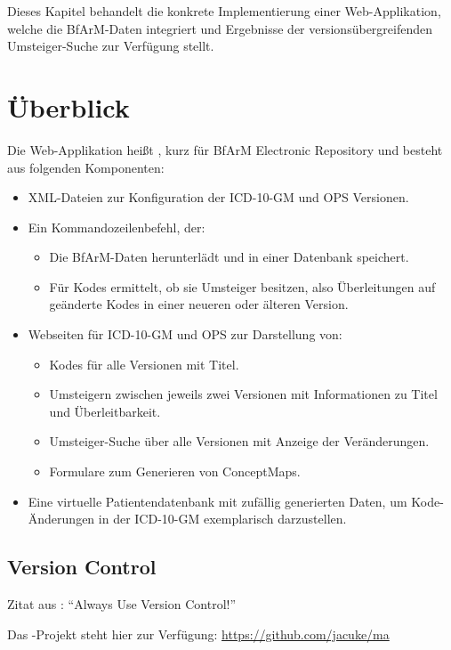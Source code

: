 Dieses Kapitel behandelt die konkrete Implementierung einer Web-Applikation, welche die BfArM-Daten integriert und Ergebnisse der versionsübergreifenden Umsteiger-Suche zur Verfügung stellt.

\section{Überblick}

Die Web-Applikation heißt \bfarmer, kurz für BfArM Electronic Repository und besteht aus folgenden Komponenten:

\begin{itemize}
\item XML-Dateien zur Konfiguration der ICD-10-GM und OPS Versionen.
\item Ein Kommandozeilenbefehl, der:
\begin{itemize}
\item Die BfArM-Daten herunterlädt und in einer Datenbank speichert.
\item Für Kodes ermittelt, ob sie Umsteiger besitzen, also Überleitungen auf geänderte Kodes in einer neueren oder älteren Version. 
\end{itemize}
\item Webseiten für ICD-10-GM und OPS zur Darstellung von:
\begin{itemize}
\item Kodes für alle Versionen mit Titel.
\item Umsteigern zwischen jeweils zwei Versionen mit Informationen zu Titel und Überleitbarkeit.
\item Umsteiger-Suche über alle Versionen mit Anzeige der Veränderungen.
\item Formulare zum Generieren von ConceptMaps.
\end{itemize}
\item Eine virtuelle Patientendatenbank mit zufällig generierten Daten, um Kode-Änderungen in der ICD-10-GM exemplarisch darzustellen.
\end{itemize}

\newpage

\subsection{Version Control}

Zitat aus \cite[Seite 163]{thomas2019pragmatic}: "`Always Use Version Control!"'

Das \bfarmer-Projekt steht hier zur Verfügung: \url{https://github.com/jacuke/ma}

